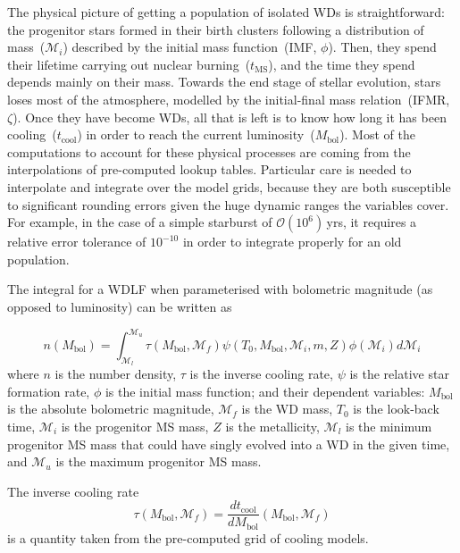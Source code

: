 \documentclass[fleqn,usenatbib]{mnras}
\begin{document}
The physical picture of getting a population of isolated WDs is
straightforward: the progenitor stars formed in their birth clusters
following a distribution of mass~($\mathcal{M}_i$) described by the initial
mass function~(IMF, $\phi$). Then, they spend their lifetime carrying out
nuclear burning~($t_{\mathrm{MS}}$), and the time they spend depends mainly
on their mass. Towards the end stage of stellar evolution, stars loses most
of the atmosphere, modelled by the initial-final mass relation~(IFMR,
$\zeta$). Once they have become WDs, all that is left is to know how long it
has been cooling~($t_{\mathrm{cool}}$) in order to reach the current
luminosity~($M_\mathrm{bol}$). Most of the computations to account for these
physical processes are coming from the interpolations of pre-computed lookup
tables. Particular care is needed to interpolate and integrate over the
model grids, because they are both susceptible to significant rounding
errors given the huge dynamic ranges the variables cover. For example, in
the case of a simple starburst of $\mathcal{O}(10^6)$\,yrs, it requires a
relative error tolerance of $10^{-10}$ in order to integrate properly for
an old population.

The integral for a WDLF when parameterised with bolometric magnitude (as
opposed to luminosity) can be written as

\begin{equation} \label{eqn:wdlf}
    n(M_{\mathrm{bol}}) = \int_{\mathcal{M}_l}^{\mathcal{M}_u}
        \tau(M_\mathrm{bol}, \mathcal{M}_f)
        \psi(T_0, M_\mathrm{bol}, \mathcal{M}_i, m, Z)
        \phi(\mathcal{M}_i) d\mathcal{M}_i
\end{equation}
where $n$ is the number density, $\tau$ is the inverse cooling rate, $\psi$ is
the relative star formation rate, $\phi$ is the initial mass function; and their
dependent variables: $M_\mathrm{bol}$ is the absolute bolometric
magnitude, $\mathcal{M}_f$ is the WD mass, $T_0$ is the look-back time, $\mathcal{M}_i$ is
the progenitor MS mass, $Z$ is the metallicity, $\mathcal{M}_l$ is the minimum
progenitor MS mass that could have singly evolved into a WD in the given time,
and $\mathcal{M}_u$ is the maximum progenitor MS mass.

The inverse cooling rate
\begin{equation}
    \tau(M_\mathrm{bol}, \mathcal{M}_f) = \dfrac{dt_{\mathrm{cool}}}{dM_\mathrm{bol}} \left( M_\mathrm{bol}, \mathcal{M}_f \right)
\end{equation}
is a quantity taken from the pre-computed grid of cooling models. 
\end{document}
